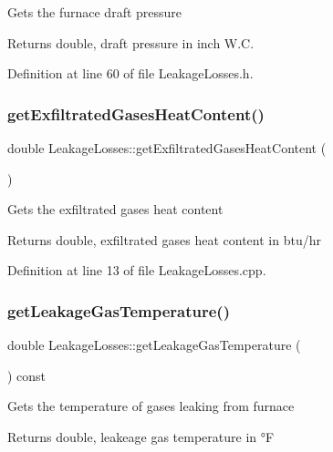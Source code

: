 Gets the furnace draft pressure \begin{DoxyReturn}{Returns}
double, draft pressure in inch W.\+C. 
\end{DoxyReturn}


Definition at line 60 of file Leakage\+Losses.\+h.

\mbox{\label{class_leakage_losses_a9663b916752bcf39a5482674e225e4a5}} 
\subsubsection{\texorpdfstring{get\+Exfiltrated\+Gases\+Heat\+Content()}{getExfiltratedGasesHeatContent()}}
{\footnotesize\ttfamily double Leakage\+Losses\+::get\+Exfiltrated\+Gases\+Heat\+Content (\begin{DoxyParamCaption}{ }\end{DoxyParamCaption})}

Gets the exfiltrated gases heat content \begin{DoxyReturn}{Returns}
double, exfiltrated gases heat content in btu/hr 
\end{DoxyReturn}


Definition at line 13 of file Leakage\+Losses.\+cpp.

\mbox{\label{class_leakage_losses_a5dbb249c07bc91611b71d62610af7234}} 
\subsubsection{\texorpdfstring{get\+Leakage\+Gas\+Temperature()}{getLeakageGasTemperature()}}
{\footnotesize\ttfamily double Leakage\+Losses\+::get\+Leakage\+Gas\+Temperature (\begin{DoxyParamCaption}{ }\end{DoxyParamCaption}) const\hspace{0.3cm}{\ttfamily [inline]}}

Gets the temperature of gases leaking from furnace \begin{DoxyReturn}{Returns}
double, leakeage gas temperature in °F 
\end{DoxyReturn}



